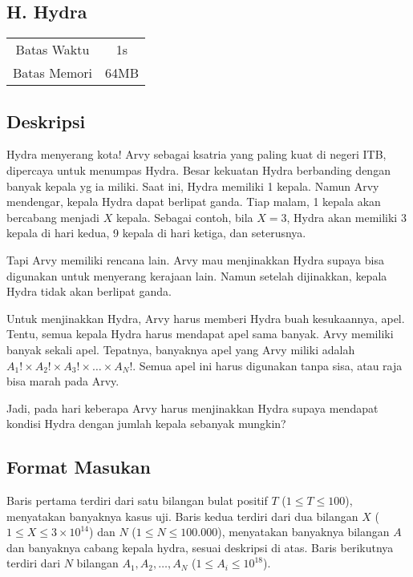 \documentclass{article}
\begin{document}
\begin{center}
    \section*{H. Hydra} %

    \begin{tabular}{ | c c | }
        \hline
        Batas Waktu  & 1s \\    %
        Batas Memori & 64MB \\  %
        \hline
    \end{tabular}
\end{center}

\subsection*{Deskripsi}

Hydra menyerang kota! Arvy sebagai ksatria yang paling kuat di negeri ITB, dipercaya untuk menumpas Hydra.
Besar kekuatan Hydra berbanding dengan banyak kepala yg ia miliki.
Saat ini, Hydra memiliki 1 kepala. Namun Arvy mendengar, kepala Hydra dapat berlipat ganda.
Tiap malam, 1 kepala akan bercabang menjadi $X$ kepala.
Sebagai contoh, bila $X = 3$, Hydra akan memiliki 3 kepala di hari kedua, 9 kepala di hari ketiga, dan seterusnya.

Tapi Arvy memiliki rencana lain. Arvy mau menjinakkan Hydra supaya bisa digunakan untuk menyerang kerajaan lain.
Namun setelah dijinakkan, kepala Hydra tidak akan berlipat ganda.

Untuk menjinakkan Hydra, Arvy harus memberi Hydra buah kesukaannya, apel.
Tentu, semua kepala Hydra harus mendapat apel sama banyak.
Arvy memiliki banyak sekali apel.
Tepatnya, banyaknya apel yang Arvy miliki adalah $A_1! \times A_2! \times A_3! \times \dots \times A_N!$.
Semua apel ini harus digunakan tanpa sisa, atau raja bisa marah pada Arvy.

Jadi, pada hari keberapa Arvy harus menjinakkan Hydra supaya mendapat kondisi Hydra dengan jumlah kepala sebanyak mungkin?

\subsection*{Format Masukan}
Baris pertama terdiri dari satu bilangan bulat positif $T$ ($1 \leq T \leq 100$), menyatakan banyaknya kasus uji.
Baris kedua terdiri dari dua bilangan $X$ ($1 \leq X \leq 3 \times {10}^{14}$) dan $N$ ($1 \leq N \leq 100.000$), menyatakan banyaknya bilangan $A$ dan banyaknya cabang kepala hydra, sesuai deskripsi di atas.
Baris berikutnya terdiri dari $N$ bilangan $A_1, A_2, \dots, A_N$ ($1 \leq A_i \leq {10}^{18}$).
\end{document}
